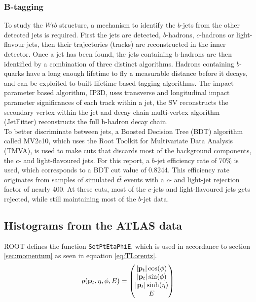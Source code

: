 \documentclass[12pt,a4paper]{article}
\numberwithin{equation}{section}
\begin{document}
\subsubsection{B-tagging}
To study the $Wtb$ structure, a mechanism to identify the $b$-jets from the
other detected jets is required. First the jets are detected, $b$-hadrons,
$c$-hadrons or light-flavour jets, then their trajectories (tracks) are
reconstructed in the inner detector. Once a jet has been found, the jets
containing b-hadrons are then identified by a combination of three distinct
algorithms. Hadrons containing $b$-quarks have a long enough lifetime to fly a
measurable distance before it decays, and can be exploited to built
lifetime-based tagging algorithms. The impact parameter based algorithm, IP3D,
uses transverse and longitudinal impact parameter significances of each track
within a jet, the SV reconstructs the secondary vertex within the jet and decay
chain multi-vertex algorithm (JetFitter) reconstructs the full b-hadron
decay chain.\\

To better discriminate between jets, a Boosted Decision Tree (BDT) algorithm
called MV2c10, which uses the Root Toolkit for Multivariate Data Analysis
(TMVA), is used to make cuts that discards most of the background components,
the $c$- and light-flavoured jets. For this report, a $b$-jet efficiency rate of
70\% is used, which corresponds to a BDT cut value of 0.8244. This efficiency
rate originates from samples of simulated $t\bar t$ events with a $c$- and
light-jet rejection factor of nearly 400\cite{ATL-PHYS-PUB-2016-012}. At these
cuts, most of the $c$-jets and light-flavoured jets gets rejected, while still
maintaining most of the $b$-jet data.



\subsection{Histograms from the ATLAS data}
ROOT defines the function \texttt{SetPtEtaPhiE}, which is used in accordance to
section \ref{sec:momentum} as seen in equation \eqref{eq:TLorentz}.
\begin{equation} \label{eq:TLorentz}
p({\vb p_t}, \eta, \phi, E) =
\begin{pmatrix}
|{\vb p_t}| \cos(\phi)\\ |{\vb p_t}|\sin(\phi)\\ |{\vb p_t}| \sinh(\eta)\\ E
\end{pmatrix}
\end{equation}
\end{document}
